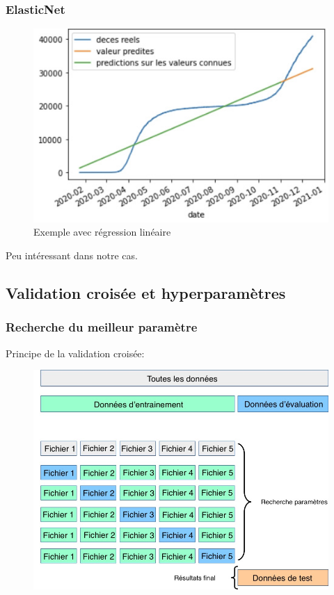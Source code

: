 \documentclass{beamer}
\begin{document}
\begin{frame}
	\frametitle{ElasticNet}
	\begin{figure}[b]
		\includegraphics[scale=0.43]{EN}
		\centering
		\caption{Exemple avec régression linéaire}
	\end{figure}
	Peu intéressant dans notre cas.
\end{frame}

\subsection{Validation croisée et hyperparamètres}
\begin{frame}
	\frametitle{Recherche du meilleur paramètre}
	Principe de la  validation croisée:
	\begin{figure}[b]
		\centering
		\includegraphics[scale=0.27]{gscv}
	\end{figure}
\end{frame}
\end{document}
